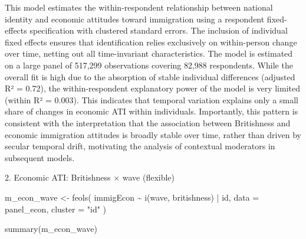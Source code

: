 \documentclass[
  11pt,
  letterpaper,
  DIV=11,
  numbers=noendperiod]{scrartcl}
\newenvironment{Shaded}{\begin{snugshade}}{\end{snugshade}}
\newcommand{\AttributeTok}[1]{\textcolor[rgb]{0.40,0.45,0.13}{#1}}
\newcommand{\FunctionTok}[1]{\textcolor[rgb]{0.28,0.35,0.67}{#1}}
\newcommand{\NormalTok}[1]{\textcolor[rgb]{0.00,0.23,0.31}{#1}}
\newcommand{\OtherTok}[1]{\textcolor[rgb]{0.00,0.23,0.31}{#1}}
\newcommand{\SpecialCharTok}[1]{\textcolor[rgb]{0.37,0.37,0.37}{#1}}
\newcommand{\StringTok}[1]{\textcolor[rgb]{0.13,0.47,0.30}{#1}}
\begin{document}
This model estimates the within-respondent relationship between national
identity and economic attitudes toward immigration using a respondent
fixed-effects specification with clustered standard errors. The
inclusion of individual fixed effects ensures that identification relies
exclusively on within-person change over time, netting out all
time-invariant characteristics. The model is estimated on a large panel
of 517,299 observations covering 82,988 respondents. While the overall
fit is high due to the absorption of stable individual differences
(adjusted R² = 0.72), the within-respondent explanatory power of the
model is very limited (within R² = 0.003). This indicates that temporal
variation explains only a small share of changes in economic ATI within
individuals. Importantly, this pattern is consistent with the
interpretation that the association between Britishness and economic
immigration attitudes is broadly stable over time, rather than driven by
secular temporal drift, motivating the analysis of contextual moderators
in subsequent models.

2. Economic ATI: Britishness × wave (flexible)

\begin{Shaded}
\begin{Highlighting}[]
\NormalTok{m\_econ\_wave }\OtherTok{\textless{}{-}} \FunctionTok{feols}\NormalTok{(}
\NormalTok{immigEcon }\SpecialCharTok{\textasciitilde{}} \FunctionTok{i}\NormalTok{(wave, britishness) }\SpecialCharTok{|}\NormalTok{ id,}
\AttributeTok{data =}\NormalTok{ panel\_econ,}
\AttributeTok{cluster =} \StringTok{"id"}
\NormalTok{)}

\FunctionTok{summary}\NormalTok{(m\_econ\_wave)}
\end{Highlighting}
\end{Shaded}
\end{document}
